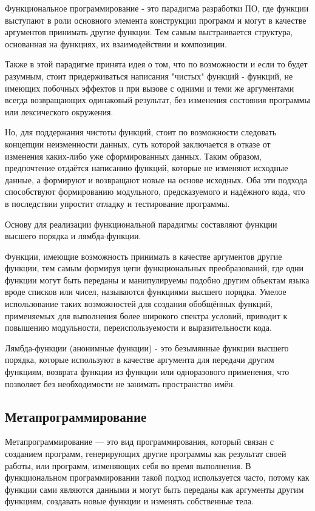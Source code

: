 Функциональное программирование - это парадигма разработки ПО, где функции выступают в роли основного элемента конструкции программ и могут в качестве аргументов принимать другие функции. Тем самым выстраивается структура, основанная на функциях, их взаимодействии и композиции.

Также в этой парадигме принята идея о том, что по возможности и если то будет разумным, стоит придерживаться написания "чистых" функций - функций, не имеющих побочных эффектов и при вызове с одними и теми же аргументами всегда возвращающих одинаковый результат, без изменения состояния программы или лексического окружения.

Но, для поддержания чистоты функций, стоит по возможности следовать концепции неизменности данных, суть которой заключается в отказе от изменения каких-либо уже сформированных данных. Таким образом, предпочтение отдаётся написанию функций, которые не изменяют исходные данные, а формируют и возвращают новые на основе исходных. Оба эти подхода способствуют формированию модульного, предсказуемого и надёжного кода, что в последствии упростит отладку и тестирование программы.

Основу для реализации функциональной парадигмы составляют функции высшего порядка и лямбда-функции.

Функции, имеющие возможность принимать в качестве аргументов другие функции, тем самым формируя цепи функциональных преобразований, где одни функции могут быть переданы и манипулируемы подобно другим объектам языка вроде списков или чисел, называются функциями высшего порядка. Умелое использование таких возможностей для создания обобщённых функций, применяемых для выполнения более широкого спектра условий, приводит к повышению модульности, переиспользуемости и выразительности кода.

Лямбда-функции (анонимные функции) - это безымянные функции высшего порядка, которые используют в качестве аргумента для передачи другим функциям, возврата функции из функции или одноразового применения, что позволяет без необходимости не занимать пространство имён.

\subsection{Метапрограммирование}
Метапрограммирование — это вид программирования, который связан с созданием программ, генерирующих другие программы как результат своей работы, или программ, изменяющих себя во время выполнения. В функциональном программировании такой подход используется часто, потому как функции сами являются данными и могут быть переданы как аргументы другим функциям, создавать новые функции и изменять собственные тела.

